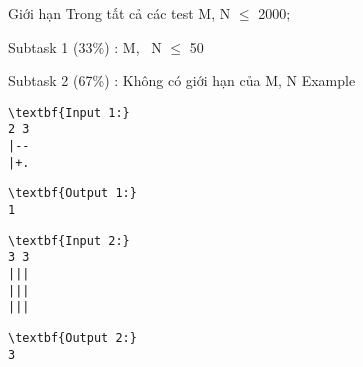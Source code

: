 Giới hạn
Trong tất cả các test M, N  $\le$  2000;

Subtask 1 (33\%) : M,  N  $\le$  50

Subtask 2 (67\%) : Không có giới hạn của M, N
Example
\begin{verbatim}
\textbf{Input 1:}
2 3
|--
|+.\end{verbatim}
\begin{verbatim}
\textbf{Output 1:}
1\end{verbatim}
\begin{verbatim}
\textbf{Input 2:}
3 3
|||
|||
|||\end{verbatim}
\begin{verbatim}
\textbf{Output 2:}
3\end{verbatim}